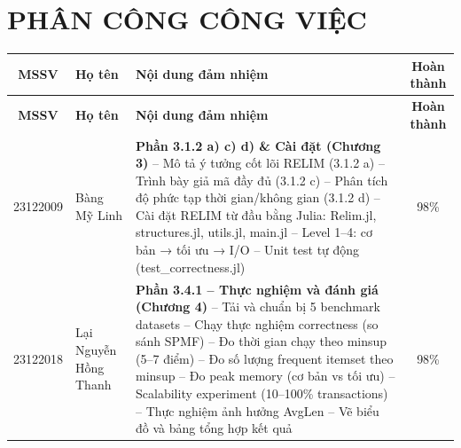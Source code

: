 \documentclass[12pt,a4paper]{report}
\begin{document}
\chapter{PHÂN CÔNG CÔNG VIỆC}
 
\begin{longtable}{|c|p{3.5cm}|p{7.5cm}|c|}
\hline
\textbf{MSSV} & \textbf{Họ tên} & \textbf{Nội dung đảm nhiệm} & \textbf{Hoàn thành} \\
\hline
\endfirsthead
\hline
\textbf{MSSV} & \textbf{Họ tên} & \textbf{Nội dung đảm nhiệm} & \textbf{Hoàn thành} \\
\hline
\endhead
 
23122009 & Bàng Mỹ Linh &
  \textbf{Phần 3.1.2 a) c) d) \& Cài đặt (Chương 3)} \newline
  -- Mô tả ý tưởng cốt lõi RELIM (3.1.2 a) \newline
  -- Trình bày giả mã đầy đủ (3.1.2 c) \newline
  -- Phân tích độ phức tạp thời gian/không gian (3.1.2 d) \newline
  -- Cài đặt RELIM từ đầu bằng Julia: \newline
  \hspace{1em} Relim.jl, structures.jl, utils.jl, main.jl \newline
  -- Level 1--4: cơ bản → tối ưu → I/O \newline
  -- Unit test tự động (test\_correctness.jl)
  & 98\%  \\
\hline
 
23122018 & Lại Nguyễn Hồng Thanh &
  \textbf{Phần 3.4.1 -- Thực nghiệm và đánh giá (Chương 4)} \newline
  -- Tải và chuẩn bị 5 benchmark datasets \newline
  -- Chạy thực nghiệm correctness (so sánh SPMF) \newline
  -- Đo thời gian chạy theo minsup (5--7 điểm) \newline
  -- Đo số lượng frequent itemset theo minsup \newline
  -- Đo peak memory (cơ bản vs tối ưu) \newline
  -- Scalability experiment (10--100\% transactions) \newline
  -- Thực nghiệm ảnh hưởng AvgLen \newline
  -- Vẽ biểu đồ và bảng tổng hợp kết quả
  & 98\% \\
\hline
 

\end{longtable}
\end{document}
